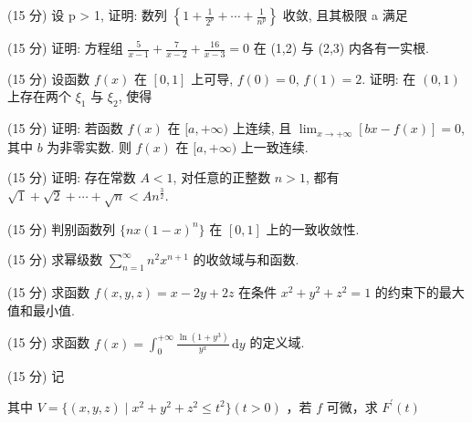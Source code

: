 \par{}
(15 分) 设 p > 1, 证明: 数列  $\left\{1 + \frac{1}{2^{p}} + \cdots + \frac{1}{n^{p}}\right\}$  收敛, 且其极限 a 满足\par
\nopagebreak[4]
(15 分) 证明: 方程组 $\frac{5}{x - 1} + \frac{7}{x - 2} + \frac{16}{x - 3} = 0$ 在 (1,2) 与 (2,3) 内各有一实根.\par
\par{}
(15 分) 设函数 $f(x)$ 在 $[0,1]$ 上可导, $f(0) = 0$, $f(1) = 2$. 证明: 在 $(0,1)$ 上存在两个 $\xi_1$ 与 $\xi_2$, 使得\par
\nopagebreak[4]
(15 分) 证明: 若函数 $f(x)$ 在 $[a, +\infty)$ 上连续, 且 $\lim_{x \to +\infty} [bx - f(x)] = 0$, 其中 $b$ 为非零实数. 则 $f(x)$ 在 $[a, +\infty)$ 上一致连续.\par
(15 分) 证明: 存在常数 $A < 1$, 对任意的正整数 $n > 1$, 都有 $\sqrt{1} + \sqrt{2} + \cdots + \sqrt{n} < An^{\frac{3}{2}}$.\par
(15 分) 判别函数列 $\{nx(1 - x)^n\}$ 在 $[0, 1]$ 上的一致收敛性.\par
(15 分) 求幂级数 $\sum_{n=1}^{\infty} n^{2} x^{n+1}$ 的收敛域与和函数.\par
(15 分) 求函数 $f(x, y, z) = x - 2y + 2z$ 在条件 $x^2 + y^2 + z^2 = 1$ 的约束下的最大值和最小值.\par
(15 分) 求函数 $f(x) = \int_{0}^{+\infty} \frac{\ln(1 + y^3)}{y^x} \, \mathrm{d}y$ 的定义域.\par
\par{}
(15 分) 记\par
\nopagebreak[4]
其中 $V = \{(x,y,z)\mid x^2 +y^2 +z^2\leq t^2\}$$(t > 0)$ ，若 $f$ 可微，求 $F^{\prime}(t)$\par
